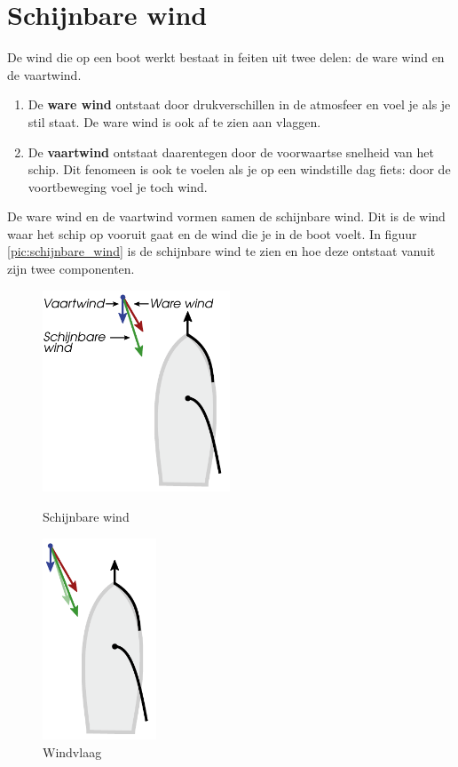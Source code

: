 \newpage
\section{Schijnbare wind}
De wind die op een boot werkt bestaat in feiten uit twee delen: de ware wind en de vaartwind.

\begin{enumerate}
	\item De \textbf{ware wind} ontstaat door drukverschillen in de atmosfeer en voel je als je stil staat. De ware wind is ook af te zien aan vlaggen. 
	\item De \textbf{vaartwind} ontstaat daarentegen door de voorwaartse snelheid van het schip. Dit fenomeen is ook te voelen als je op een windstille dag fiets: door de voortbeweging voel je toch wind. 
\end{enumerate}

De ware wind en de vaartwind vormen samen de schijnbare wind. Dit is de wind waar het schip op vooruit gaat en de wind die je in de boot voelt. In figuur \ref{pic:schijnbare_wind} is de schijnbare wind te zien en hoe deze ontstaat vanuit zijn twee componenten. 

\begin{figure}[H]
	\centering
	\begin{minipage}[b]{0.49\textwidth}
		\centering
		\includegraphics[height=6cm]{Hoofdstukken/Krachten/pdf/wind_schijnbaar.pdf}
		\caption{Schijnbare wind}
		\label{pic:schijnbare_wind}
	\end{minipage}
	\hfill
	\begin{minipage}[b]{0.49\textwidth}
		\centering
		\includegraphics[height=6cm]{Hoofdstukken/Krachten/pdf/wind_vlaag.pdf}
		\caption{Windvlaag}
		\label{pic:windvlaag}
	\end{minipage}
\end{figure}

